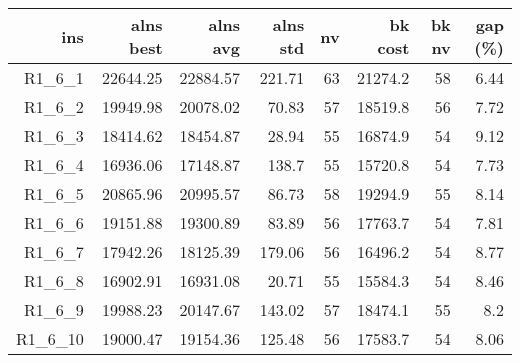   \begin{table}[caption={Kết quả đo với tập HG\_R\_1\_6 600 yêu cầu}, label=exp:HGR16]
    \centering
    \begin{tabular}{rrrrrrrr}
    \hline
    ins & alns best & alns avg & alns std & nv & bk cost & bk nv & gap (\%) \\ \hline
    R1\_6\_1 & 22644.25 & 22884.57 & 221.71 & 63 & 21274.2 & 58 & 6.44 \\ \hline
    R1\_6\_2 & 19949.98 & 20078.02 & 70.83 & 57 & 18519.8 & 56 & 7.72 \\ \hline
    R1\_6\_3 & 18414.62 & 18454.87 & 28.94 & 55 & 16874.9 & 54 & 9.12 \\ \hline
    R1\_6\_4 & 16936.06 & 17148.87 & 138.7 & 55 & 15720.8 & 54 & 7.73 \\ \hline
    R1\_6\_5 & 20865.96 & 20995.57 & 86.73 & 58 & 19294.9 & 55 & 8.14 \\ \hline
    R1\_6\_6 & 19151.88 & 19300.89 & 83.89 & 56 & 17763.7 & 54 & 7.81 \\ \hline
    R1\_6\_7 & 17942.26 & 18125.39 & 179.06 & 56 & 16496.2 & 54 & 8.77 \\ \hline
    R1\_6\_8 & 16902.91 & 16931.08 & 20.71 & 55 & 15584.3 & 54 & 8.46 \\ \hline
    R1\_6\_9 & 19988.23 & 20147.67 & 143.02 & 57 & 18474.1 & 55 & 8.2 \\ \hline
    R1\_6\_10 & 19000.47 & 19154.36 & 125.48 & 56 & 17583.7 & 54 & 8.06 \\ \hline
    \end{tabular}
  \end{table}


